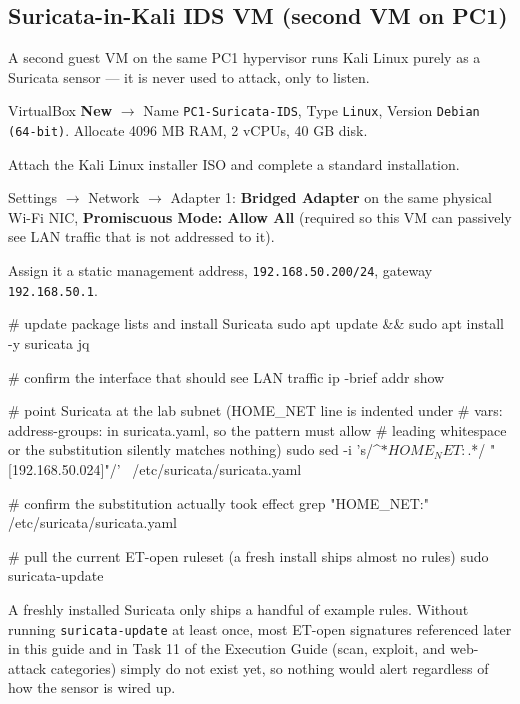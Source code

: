 \documentclass[11pt,a4paper]{article}
\begin{document}
\subsection{Suricata-in-Kali IDS VM (second VM on PC1)}
A second guest VM on the same PC1 hypervisor runs Kali Linux purely as a Suricata
sensor --- it is never used to attack, only to listen.

\begin{steps}
\item VirtualBox \textbf{New} $\to$ Name \texttt{PC1-Suricata-IDS}, Type \texttt{Linux},
  Version \texttt{Debian (64-bit)}. Allocate 4096 MB RAM, 2 vCPUs, 40 GB disk.
\item Attach the Kali Linux installer ISO and complete a standard installation.
\item Settings $\to$ Network $\to$ Adapter 1: \textbf{Bridged Adapter} on the same
  physical Wi-Fi NIC, \textbf{Promiscuous Mode: Allow All} (required so this VM can
  passively see LAN traffic that is not addressed to it).
\item Assign it a static management address, \texttt{192.168.50.200/24}, gateway
  \texttt{192.168.50.1}.
\end{steps}

\begin{cmdbox}
\begin{cmdverb}
# update package lists and install Suricata
sudo apt update && sudo apt install -y suricata jq

# confirm the interface that should see LAN traffic
ip -brief addr show

# point Suricata at the lab subnet (HOME_NET line is indented under
# vars: address-groups: in suricata.yaml, so the pattern must allow
# leading whitespace or the substitution silently matches nothing)
sudo sed -i 's/^\( *HOME_NET:\).*/\1 "[192.168.50.0\/24]"/' \
    /etc/suricata/suricata.yaml

# confirm the substitution actually took effect
grep "HOME_NET:" /etc/suricata/suricata.yaml

# pull the current ET-open ruleset (a fresh install ships almost no rules)
sudo suricata-update
\end{cmdverb}
\end{cmdbox}

\begin{notebox}
A freshly installed Suricata only ships a handful of example rules. Without running
\texttt{suricata-update} at least once, most ET-open signatures referenced later in
this guide and in Task 11 of the Execution Guide (scan, exploit, and web-attack
categories) simply do not exist yet, so nothing would alert regardless of how the
sensor is wired up.
\end{notebox}
\end{document}
